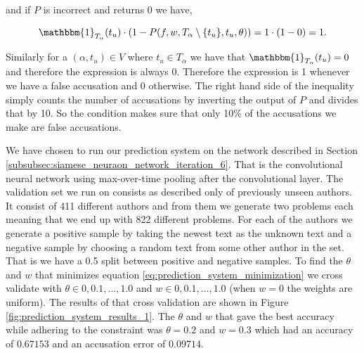 and if $P$ is incorrect and returns 0 we have,

\begin{equation}
    \mathbbm{1}_{T_\alpha}(t_u) \cdot
    \left(1 - P(f, w, T_\alpha \setminus \{t_u\}, t_u, \theta)\right) =
    1 \cdot (1 - 0) = 1.
\end{equation}

Similarly for a $(\alpha, t_u) \in V$ where $t_u \in T_\alpha$ we have that
$\mathbbm{1}_{T_\alpha}(t_u) = 0$ and therefore the expression is always
0. Therefore the expression is 1 whenever we have a false accusation and 0
otherwise. The right hand side of the inequality simply counts the number of
accusations by inverting the output of $P$ and divides that by 10. So the
condition makes sure that only 10\% of the accusations we make are false
accusations.

We have chosen to run our prediction system on the network described in Section
\ref{subsubsec:siamese_neuraon_network_iteration_6}. That is the convolutional
neural network using max-over-time pooling after the convolutional layer.
The validation set we run on consists as described only of previously unseen
authors. It consist of 411 different authors and from them we generate two
problems each meaning that we end up with 822 different problems. For each
of the authors we generate a positive sample by taking the newest text as
the unknown text and a negative sample by choosing a random text from some
other author in the set. That is we have a 0.5 split between positive and
negative samples. To find the $\theta$ and $w$ that minimizes equation
\ref{eq:prediction_system_minimization} we cross validate with $\theta \in
0, 0.1, \dots, 1.0$ and $w \in 0, 0.1, \dots, 1.0$ (when $w = 0$ the weights
are uniform). The results of that cross validation are shown in Figure
\ref{fig:prediction_system_results_1}. The $\theta$ and $w$ that gave the best
accuracy while adhering to the constraint was $\theta = 0.2$ and $w = 0.3$ which
had an accuracy of $0.67153$ and an accusation error of $0.09714$.

